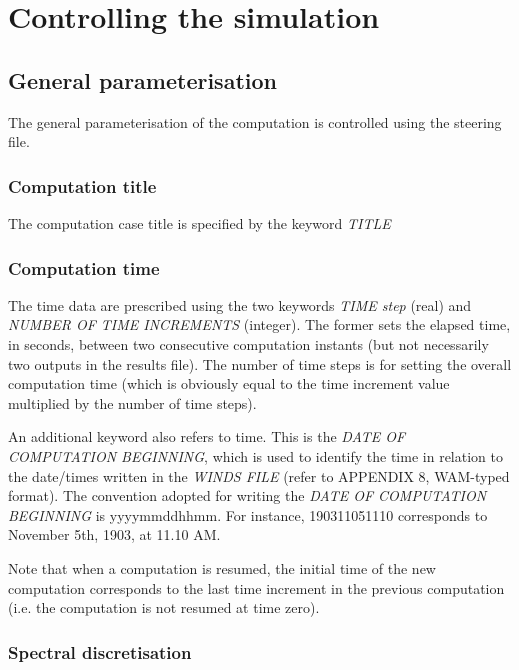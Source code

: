 \chapter{ Controlling the simulation }


\section{ General parameterisation }

 The general parameterisation of the computation is controlled using the steering file.


\subsection{ Computation title}

The computation case title is specified by the keyword \textit{TITLE}


\subsection{ Computation time}

 The time data are prescribed using the two keywords \textit{TIME step} (real) and \textit{NUMBER OF TIME INCREMENTS }(integer). The former sets the elapsed time, in seconds, between two consecutive computation instants (but not necessarily two outputs in the results file). The number of time steps is for setting the overall computation time (which is obviously equal to the time increment value multiplied by the number of time steps).

 An additional keyword also refers to time. This is the \textit{DATE OF COMPUTATION BEGINNING}, which is used to identify the time in relation to the date/times written in the \textit{WINDS FILE} (refer to APPENDIX 8, WAM-typed format). The convention adopted for writing the \textit{DATE OF COMPUTATION BEGINNING} is yyyymmddhhmm. For instance, 190311051110 corresponds to November 5th, 1903, at 11.10 AM.

 Note that when a computation is resumed, the initial time of the new computation corresponds to the last time increment in the previous computation (i.e. the computation is not resumed at time zero).


\subsection{ Spectral discretisation}

